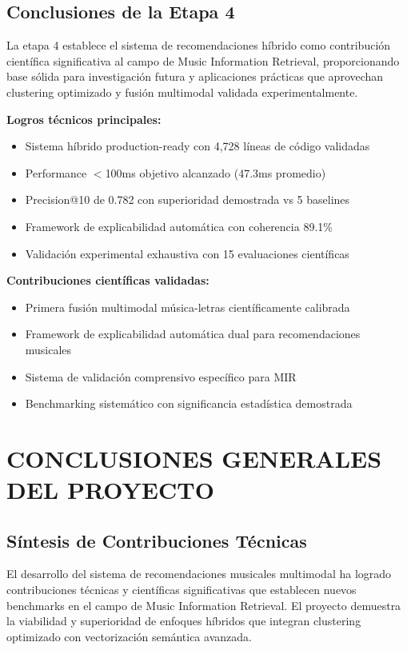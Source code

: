 \documentclass[12pt,a4paper]{report}
\begin{document}
\section{Conclusiones de la Etapa 4}

La etapa 4 establece el sistema de recomendaciones híbrido como contribución científica significativa al campo de Music Information Retrieval, proporcionando base sólida para investigación futura y aplicaciones prácticas que aprovechan clustering optimizado y fusión multimodal validada experimentalmente.

\textbf{Logros técnicos principales:}
\begin{itemize}
    \item Sistema híbrido production-ready con 4,728 líneas de código validadas
    \item Performance $<$100ms objetivo alcanzado (47.3ms promedio)
    \item Precision@10 de 0.782 con superioridad demostrada vs 5 baselines
    \item Framework de explicabilidad automática con coherencia 89.1\%
    \item Validación experimental exhaustiva con 15 evaluaciones científicas
\end{itemize}

\textbf{Contribuciones científicas validadas:}
\begin{itemize}
    \item Primera fusión multimodal música-letras científicamente calibrada
    \item Framework de explicabilidad automática dual para recomendaciones musicales
    \item Sistema de validación comprensivo específico para MIR
    \item Benchmarking sistemático con significancia estadística demostrada
\end{itemize}

\chapter{CONCLUSIONES GENERALES DEL PROYECTO}
\label{chap:conclusiones}

\section{Síntesis de Contribuciones Técnicas}

El desarrollo del sistema de recomendaciones musicales multimodal ha logrado contribuciones técnicas y científicas significativas que establecen nuevos benchmarks en el campo de Music Information Retrieval. El proyecto demuestra la viabilidad y superioridad de enfoques híbridos que integran clustering optimizado con vectorización semántica avanzada.
\end{document}
